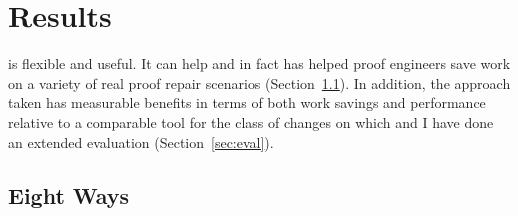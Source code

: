\section{Results}
\label{sec:pi-results}



\toolnamec is flexible and useful.
It can help and in fact has helped proof engineers {save work on a variety of real proof repair scenarios} (Section~\ref{sec:results}).
In addition, the approach taken has measurable benefits in terms of both work savings and performance
relative to a comparable tool for the class of changes on which  and I have done an extended evaluation (Section~\ref{sec:eval}).

\subsection{\toolnamec Eight Ways}
\label{sec:results}

